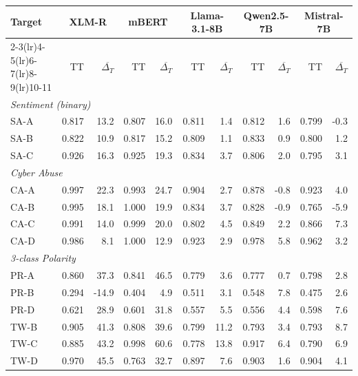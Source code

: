 \begin{tabular}{lrrrrrrrrrr}
\toprule
Target & \multicolumn{2}{c}{XLM-R} & \multicolumn{2}{c}{mBERT} & \multicolumn{2}{c}{Llama-3.1-8B} & \multicolumn{2}{c}{Qwen2.5-7B} & \multicolumn{2}{c}{Mistral-7B} \\
\cmidrule(lr){2-3}\cmidrule(lr){4-5}\cmidrule(lr){6-7}\cmidrule(lr){8-9}\cmidrule(lr){10-11}
 & TT & $\overline{\Delta_T}$ & TT & $\overline{\Delta_T}$ & TT & $\overline{\Delta_T}$ & TT & $\overline{\Delta_T}$ & TT & $\overline{\Delta_T}$ \\
\midrule
\multicolumn{11}{l}{\textit{Sentiment (binary)}} \\
SA-A & 0.817 & 13.2 & 0.807 & 16.0 & 0.811 & 1.4 & 0.812 & 1.6 & 0.799 & -0.3 \\
SA-B & 0.822 & 10.9 & 0.817 & 15.2 & 0.809 & 1.1 & 0.833 & 0.9 & 0.800 & 1.2 \\
SA-C & 0.926 & 16.3 & 0.925 & 19.3 & 0.834 & 3.7 & 0.806 & 2.0 & 0.795 & 3.1 \\
\midrule
\multicolumn{11}{l}{\textit{Cyber Abuse}} \\
CA-A & 0.997 & 22.3 & 0.993 & 24.7 & 0.904 & 2.7 & 0.878 & -0.8 & 0.923 & 4.0 \\
CA-B & 0.995 & 18.1 & 1.000 & 19.9 & 0.834 & 3.7 & 0.828 & -0.9 & 0.765 & -5.9 \\
CA-C & 0.991 & 14.0 & 0.999 & 20.0 & 0.802 & 4.5 & 0.849 & 2.2 & 0.866 & 7.3 \\
CA-D & 0.986 & 8.1 & 1.000 & 12.9 & 0.923 & 2.9 & 0.978 & 5.8 & 0.962 & 3.2 \\
\midrule
\multicolumn{11}{l}{\textit{3-class Polarity}} \\
PR-A & 0.860 & 37.3 & 0.841 & 46.5 & 0.779 & 3.6 & 0.777 & 0.7 & 0.798 & 2.8 \\
PR-B & 0.294 & -14.9 & 0.404 & 4.9 & 0.511 & 3.1 & 0.548 & 7.8 & 0.475 & 2.6 \\
PR-D & 0.621 & 28.9 & 0.601 & 31.8 & 0.557 & 5.5 & 0.556 & 4.4 & 0.598 & 7.6 \\
TW-B & 0.905 & 41.3 & 0.808 & 39.6 & 0.799 & 11.2 & 0.793 & 3.4 & 0.793 & 8.7 \\
TW-C & 0.885 & 43.2 & 0.998 & 60.6 & 0.778 & 13.8 & 0.917 & 6.4 & 0.790 & 6.9 \\
TW-D & 0.970 & 45.5 & 0.763 & 32.7 & 0.897 & 7.6 & 0.903 & 1.6 & 0.904 & 4.1 \\
\bottomrule
\end{tabular}
